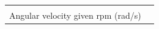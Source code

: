 \documentclass[
  letterpaper,
  DIV=11,
  numbers=noendperiod]{scrreprt}
\theoremstyle{definition}
\theoremstyle{remark}
\begin{document}
\begin{longtable}[]{@{}
  >{\raggedright\arraybackslash}p{}
  >{\raggedright\arraybackslash}p{}@{}}
                                                                                                                                                                                                                                                                                                                                                                                                                                                                                                                                                                                                                                                                                                                                                                                                                                                                                                                                                                                                                                                                                                                                                                                                                                                                                                                                                                                                                                                                                                                                                                                                                                                                                                  \) \\
Angular velocity given rpm (rad/s) &

\end{longtable}
\end{document}
